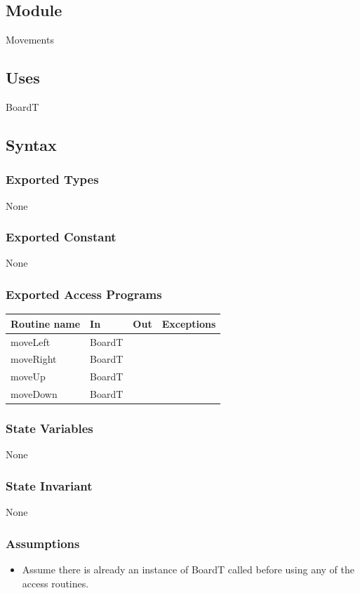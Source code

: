 \documentclass[12pt]{article}
\begin{document}
\subsection*{Module}
Movements

\subsection* {Uses}
BoardT
\subsection* {Syntax}
\subsubsection* {Exported Types}
None
\subsubsection* {Exported Constant}
None
\subsubsection* {Exported Access Programs}
\begin{tabular}{| l | l | l | l |}
\hline
\textbf{Routine name} & \textbf{In} & \textbf{Out} & \textbf{Exceptions}\\
\hline
moveLeft & BoardT &  & \\
\hline
moveRight & BoardT &  & \\
\hline
moveUp & BoardT &  & \\
\hline
moveDown & BoardT &  & \\
\hline
\end{tabular}

\subsubsection* {State Variables}
None

\subsubsection* {State Invariant}
None

\subsubsection* {Assumptions}
\begin{itemize}
  \item Assume there is already an instance of BoardT called before using any of the access routines.
\end{itemize}
\end{document}
